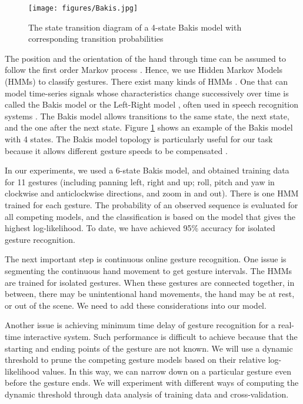 \begin{figure}[htp]
\begin{center}
\texttt{[image: figures/Bakis.jpg]}
\caption{{The state transition diagram of a 4-state Bakis model with corresponding transition probabilities}}\label{fig:bakis}
\end{center}
\end{figure}

The position and the orientation of the hand through time can be assumed to follow the first order Markov process \cite{Starner95}. Hence, we use Hidden Markov Models (HMMs) to classify gestures. There exist many kinds of HMMs \cite{Rabiner86}. One that can model time-series signals whose characteristics change successively over time is called the Bakis model \cite{Bauer00} or the Left-Right model \cite{Rabiner90}, often used in speech recognition systems \cite{Bauer00}. The Bakis model allows transitions to the same state, the next state, and the one after the next state.  Figure \ref{fig:bakis} shows an example of the Bakis model with 4 states. The Bakis model topology is particularly useful for our task because it allows different gesture speeds to be compensated \cite{Bauer00}.
	
In our experiments, we used a 6-state Bakis model, and obtained training data for 11 gestures (including panning left, right and up; roll, pitch and yaw in clockwise and anticlockwise directions, and zoom in and out). There is one HMM trained for each gesture. The probability of an observed sequence is evaluated for all competing models, and the classification is based on the model that gives the highest log-likelihood. To date, we have achieved 95\% accuracy for isolated gesture recognition. 

The next important step is continuous online gesture recognition. One issue is segmenting the continuous hand movement to get gesture intervals. The HMMs are trained for isolated gestures. When these gestures are connected together, in between, there may be unintentional hand movements, the hand may be at rest, or out of the scene. We need to add these considerations into our model.

Another issue is achieving minimum time delay of gesture recognition for a real-time interactive system. Such performance is difficult to achieve because that the starting and ending points of the gesture are not known. We will use a dynamic threshold to prune the competing gesture models based on their relative log-likelihood values. In this way, we can narrow down on a particular gesture even before the gesture ends. We will experiment with different ways of computing the dynamic threshold through data analysis of training data and cross-validation.
 
